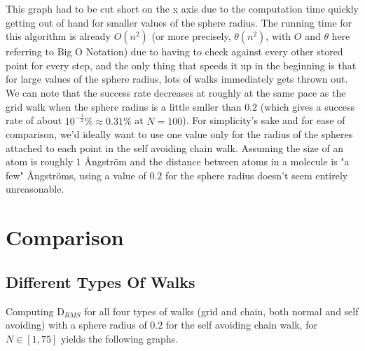 \documentclass[a4paper,12pt]{article}
\begin{document}
This graph had to be cut short on the x axis due to the computation time quickly getting out of hand for smaller
values of the sphere radius. The running time for this algorithm is already $O(n^2)$ (or more precisely,
$\theta (n^2)$, with $O$ and $\theta$ here referring to Big O Notation) due to having to check against every other
stored point for every step, and the only thing that speeds it up in the beginning is that for large values of the
sphere radius, lots of walks immediately gets thrown out. We can note that the success rate decreases at roughly
at the same pace as the grid walk when the sphere radius is a little smller than $0.2$ (which gives a success rate
of about $10^{-\frac{1}{2}} \% \approx 0.31\%$ at $N = 100$). For simplicity's sake and for ease of comparison, we'd
ideally want to use one value only for the radius of the spheres attached to each point in the self avoiding chain
walk. Assuming the size of an atom is roughly $1$ Ångström and the distance between atoms in a molecule is "a few"
Ångströms, using a value of $0.2$ for the sphere radius doesn't seem entirely unreasonable.

\section*{Comparison}

\subsection*{Different Types Of Walks}

Computing $\mathrm{D}_{RMS}$ for all four types of walks (grid and chain, both normal and self avoiding) with a
sphere radius of $0.2$ for the self avoiding chain walk, for $N \in [1, 75]$ yields the following graphs.
\end{document}
